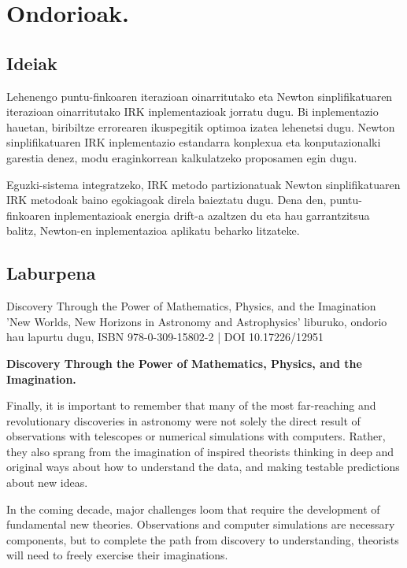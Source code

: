 \chapter{Ondorioak.}


\section*{Ideiak}


Lehenengo puntu-finkoaren iterazioan oinarritutako eta Newton sinplifikatuaren iterazioan oinarritutako IRK inplementazioak jorratu dugu. Bi inplementazio hauetan, biribiltze errorearen ikuspegitik optimoa izatea lehenetsi dugu. Newton sinplifikatuaren IRK inplementazio estandarra konplexua eta konputazionalki garestia denez, modu eraginkorrean kalkulatzeko proposamen egin dugu.

Eguzki-sistema integratzeko, IRK metodo partizionatuak Newton sinplifikatuaren IRK metodoak baino egokiagoak direla baieztatu dugu. Dena den, puntu-finkoaren inplementazioak energia drift-a azaltzen du eta hau garrantzitsua balitz, Newton-en inplementazioa aplikatu beharko litzateke.        

\section*{Laburpena}

Discovery Through the Power of Mathematics, Physics, and the Imagination
'New Worlds, New Horizons in Astronomy and Astrophysics' liburuko, ondorio hau lapurtu dugu,
ISBN 978-0-309-15802-2 | DOI 10.17226/12951

\begin{displayquote}
\textbf{Discovery Through the Power of Mathematics, Physics, and the Imagination.}

Finally, it is important to remember that many of the most far-reaching and revolutionary discoveries in astronomy were not solely the direct result of observations with telescopes or numerical simulations with computers. Rather, they also sprang from the imagination of inspired theorists thinking in deep and original ways about how to understand the data, and making testable predictions about new ideas.

In the coming decade, major challenges loom that require the development of fundamental new theories. Observations and computer simulations are necessary components, but to complete the path from discovery to understanding, theorists will need to freely exercise their imaginations.
\end{displayquote}


